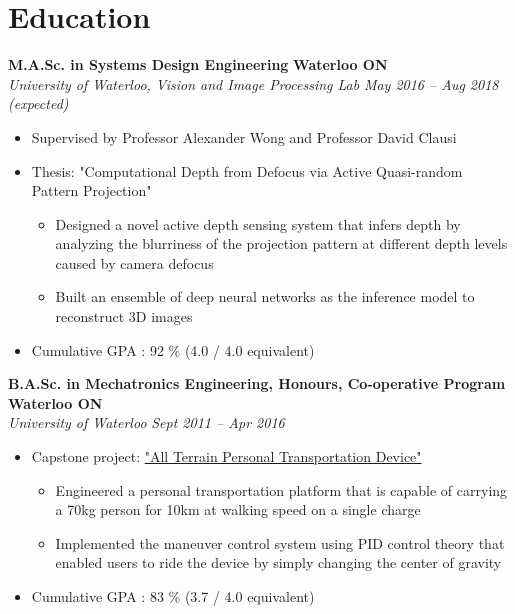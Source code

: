 \section*{Education}
\vspace{\postsubhead}
    \textbf{M.A.Sc. in Systems Design Engineering}
    \hfill
    \textbf{Waterloo ON}\\
    \textit{University of Waterloo, Vision and Image Processing Lab}
    \hfill
    \textit{May 2016 -- Aug 2018 (expected)}
    \begin{itemize}
        \item Supervised by Professor Alexander Wong and Professor David Clausi
        \item Thesis: "Computational Depth from Defocus via Active Quasi-random Pattern Projection"
        \begin{itemize}
            \item Designed a novel active depth sensing system that infers depth by analyzing the blurriness of the projection pattern at different depth levels caused by camera defocus
            \item Built an ensemble of deep neural networks as the inference model to reconstruct 3D images
        \end{itemize}
        \item Cumulative GPA : 92 \% (4.0 / 4.0 equivalent) 
    \end{itemize}
    \vspace{\interlist}

    \textbf{B.A.Sc. in Mechatronics Engineering, Honours, Co-operative Program}
    \hfill
    \textbf{Waterloo ON}\\
    \textit{University of Waterloo}
    \hfill
    \textit{Sept 2011 -- Apr 2016}
    \begin{itemize}
        \item Capstone project: \href{https://youtu.be/OwfrKlr_Zhk}{"All Terrain Personal Transportation Device"}
        \begin{itemize}
           \item Engineered a personal transportation platform that is capable of carrying a 70kg person for 10km at walking speed on a single charge
           \item Implemented the maneuver control system using PID control theory that enabled users to ride the device by simply changing the center of gravity
        \end{itemize}
        \item Cumulative GPA : 83 \% (3.7 / 4.0 equivalent)
    \end{itemize}
